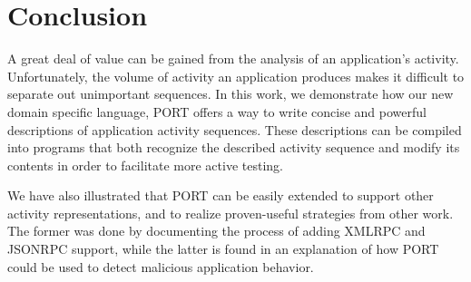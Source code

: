 \section{Conclusion}
\label{sec:Conclusion}
%
%

A great deal of value can be gained from the analysis of an application's
activity.
Unfortunately,
the volume of activity
an application produces
makes it difficult
to separate out
unimportant sequences.
In this work,
we demonstrate how our new domain specific language,
PORT offers
a way to write concise and 
powerful
descriptions of
application activity sequences.
These descriptions
can be compiled
into programs that
both recognize the described activity
sequence
and modify its contents in order to
facilitate more active testing.

We have also
illustrated that PORT
can be
easily extended
to support other activity
representations, and to 
realize proven-useful
strategies from other work.
The former was done
by documenting the process
of adding XMLRPC and JSONRPC support,
while the latter is found in
 an explanation
of how PORT could be used to
detect malicious application behavior.


